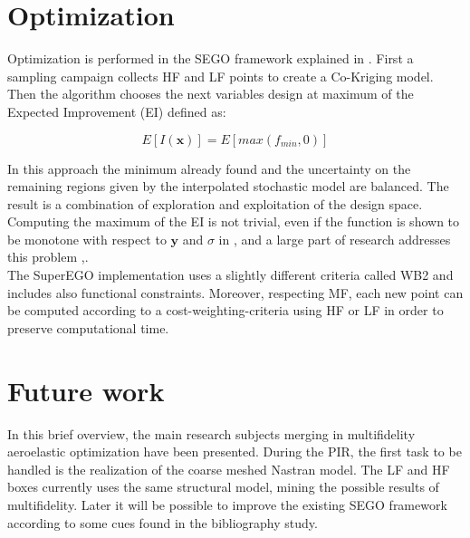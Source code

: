 \documentclass[10pt,twocolumn,a4paper]{scrartcl}
\begin{document}
\section{Optimization}\label{5}
Optimization is performed in the SEGO framework explained in \cite{Morlier}. First a sampling campaign collects HF and LF points to create a Co-Kriging model. Then the algorithm chooses the next variables design at maximum of the Expected Improvement (EI) defined as:

\begin{equation*}
E[I(\mathbf{x})] = E[max(f_{min},0)]
\end{equation*} 

\noindent In this approach the minimum already found and the uncertainty on the remaining regions given by the interpolated stochastic model are balanced. The result is a combination of exploration and exploitation of the design space. Computing the maximum of the EI is not trivial, even if the function is shown to be monotone with respect to $\mathbf{y}$ and $\sigma$ in \cite{bbf}, and a large part of research addresses this problem \cite{Morlier},\cite{}.\\
The SuperEGO implementation uses a slightly different criteria called WB2 and includes also functional constraints. Moreover, respecting MF, each new point can be computed according to a cost-weighting-criteria using HF or LF in order to preserve computational time.

\section{Future work}\label{6}
In this brief overview, the main research subjects merging in multifidelity aeroelastic optimization have been presented. During the PIR, the first task to be handled is the realization of the coarse meshed Nastran model. The LF and HF boxes currently uses the same structural model, mining the possible results of multifidelity. Later it will be possible to improve the existing SEGO framework according to some cues found in the bibliography study.

\onecolumn{

}
\end{document}
